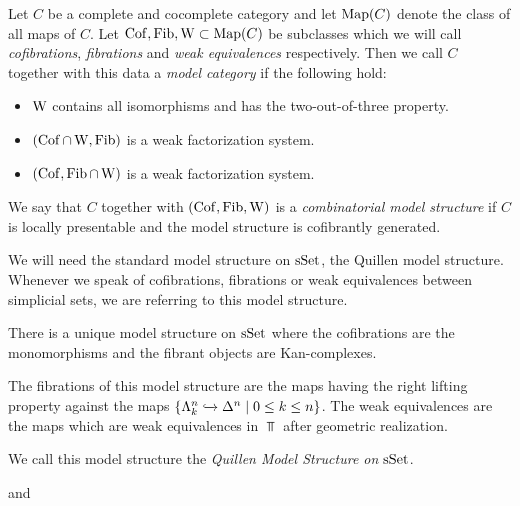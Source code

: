 \begin{definition}
    Let $C$ be a complete and cocomplete category and let $\operatorname{Map}(C)$ denote the class of all maps of $C$.
    Let $\operatorname{Cof},\operatorname{Fib},\operatorname{W}\subset\operatorname{Map}(C)$ be subclasses which we will call \emph{cofibrations}, \emph{fibrations} and \emph{weak equivalences} respectively.
    Then we call $C$ together with this data a \emph{model category} if the following hold:
    \begin{itemize}
        \item $\operatorname{W}$ contains all isomorphisms and has the two-out-of-three property.
        \item $(\operatorname{Cof}\cap\operatorname{W},\operatorname{Fib})$ is a weak factorization system.
        \item $(\operatorname{Cof},\operatorname{Fib}\cap\operatorname{W})$ is a weak factorization system.
    \end{itemize}
    We say that $C$ together with $(\operatorname{Cof},\operatorname{Fib},\operatorname{W})$ is a \emph{combinatorial model structure} if $C$ is locally presentable and the model structure is cofibrantly generated.
\end{definition}
We will need the standard model structure on $\operatorname{sSet}$, the Quillen model structure. 
Whenever we speak of cofibrations, fibrations or weak equivalences between simplicial sets, we are referring to this model structure.
\begin{prop}
    There is a unique model structure on $\operatorname{sSet}$ where the cofibrations are the monomorphisms and the fibrant objects are Kan-complexes.

    The fibrations of this model structure are the maps having the right lifting property against the maps $\left\lbrace\Lambda_k^n\xhookrightarrow{}\Delta^n\mid 0\leq k\leq n\right\rbrace$.
    The weak equivalences are the maps which are weak equivalences in $\Top$ after geometric realization.

    We call this model structure the \emph{Quillen Model Structure on $\operatorname{sSet}$}.
    \begin{reference}
        \cite[Theorem 3.1.8 and Theorem 3.1.29]{cisinski_2019} and \cite[Chap. II, \S 3, Theorem 1]{Quillen1967}
    \end{reference}
\end{prop}

